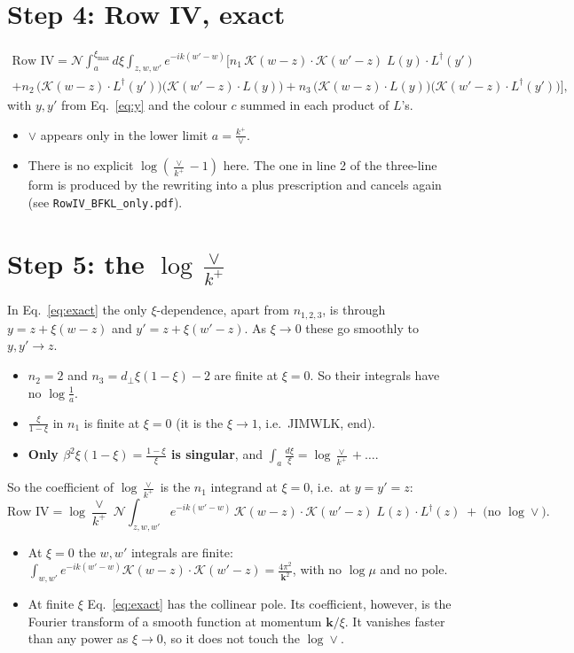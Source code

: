 \documentclass[10pt]{article}
\numberwithin{equation}{section}
\begin{document}
\section{Step 4: Row IV, exact}
\begin{multline}
\text{Row IV}=\mathcal N\int_{a}^{\xi_{\max}}d\xi\int_{z,w,w'}e^{-ik(w'-w)}\Big[n_1\,\mathcal K(w-z)\cdot\mathcal K(w'-z)\;L(y)\cdot L^\dagger(y')\\
+n_2\,\big(\mathcal K(w-z)\cdot L^\dagger(y')\big)\big(\mathcal K(w'-z)\cdot L(y)\big)+n_3\,\big(\mathcal K(w-z)\cdot L(y)\big)\big(\mathcal K(w'-z)\cdot L^\dagger(y')\big)\Big],\label{eq:exact}
\end{multline}
with $y,y'$ from Eq.~\eqref{eq:y} and the colour $c$ summed in each product of $L$'s.
\begin{itemize}
\item $\vee$ appears only in the lower limit $a=\frac{k^+}{\vee}$.
\item There is no explicit $\log(\frac{\vee}{k^+}-1)$ here. The one in line 2 of the three-line form is produced by the rewriting into a plus prescription and cancels again (see \texttt{RowIV\_BFKL\_only.pdf}).
\end{itemize}

\section{Step 5: the $\log\frac{\vee}{k^+}$}
In Eq.~\eqref{eq:exact} the only $\xi$-dependence, apart from $n_{1,2,3}$, is through $y=z+\xi(w-z)$ and $y'=z+\xi(w'-z)$. As $\xi\to0$ these go smoothly to $y,y'\to z$.
\begin{itemize}
\item $n_2=2$ and $n_3=d_\perp\xi(1-\xi)-2$ are finite at $\xi=0$. So their integrals have no $\log\frac1a$.
\item $\frac{\xi}{1-\xi}$ in $n_1$ is finite at $\xi=0$ (it is the $\xi\to1$, i.e.\ JIMWLK, end).
\item \textbf{Only $\beta^2\xi(1-\xi)=\frac{1-\xi}{\xi}$ is singular}, and $\int_a\frac{d\xi}{\xi}=\log\frac{\vee}{k^+}+\dots$.
\end{itemize}
So the coefficient of $\log\frac{\vee}{k^+}$ is the $n_1$ integrand at $\xi=0$, i.e.\ at $y=y'=z$:
\begin{equation}
\text{Row IV}=\log\frac{\vee}{k^+}\;\mathcal N\int_{z,w,w'}e^{-ik(w'-w)}\,\mathcal K(w-z)\cdot\mathcal K(w'-z)\;L(z)\cdot L^\dagger(z)\;+\;\big(\text{no }\log\vee\big).
\end{equation}
\begin{itemize}
\item At $\xi=0$ the $w,w'$ integrals are finite: $\int_{w,w'}e^{-ik(w'-w)}\mathcal K(w-z)\cdot\mathcal K(w'-z)=\frac{4\pi^2}{\mathbf k^2}$, with no $\log\mu$ and no pole.
\item At finite $\xi$ Eq.~\eqref{eq:exact} has the collinear pole. Its coefficient, however, is the Fourier transform of a smooth function at momentum $\mathbf k/\xi$. It vanishes faster than any power as $\xi\to0$, so it does not touch the $\log\vee$.
\end{itemize}
\end{document}
